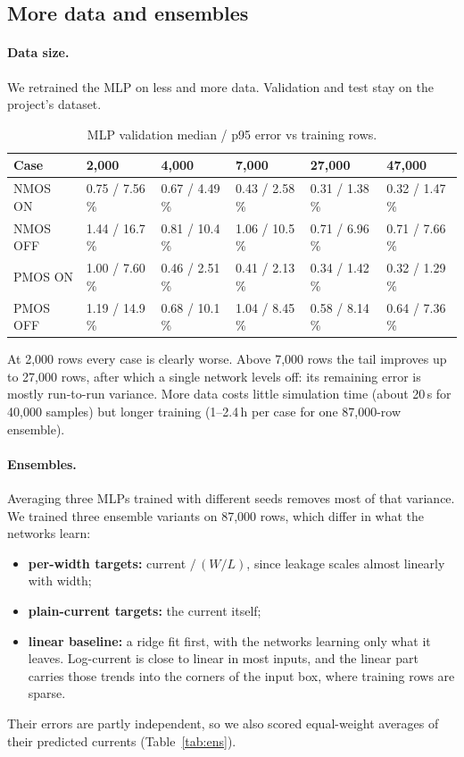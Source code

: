 \documentclass[11pt,a4paper]{article}
\newcommand{\pct}{\,\%}
\begin{document}
\subsection{More data and ensembles}

\paragraph{Data size.} We retrained the MLP on less and more data. Validation and test stay on the
project's dataset.

\begin{table}[H]
\centering
\caption{MLP validation median / p95 error vs training rows.}
\label{tab:size}
\small\setlength{\tabcolsep}{4pt}
\begin{tabular}{llllll}
\toprule
Case & 2,000 & 4,000 & 7,000 & 27,000 & 47,000 \\
\midrule
NMOS ON  & 0.75 / 7.56\pct & 0.67 / 4.49\pct & 0.43 / 2.58\pct & 0.31 / 1.38\pct & 0.32 / 1.47\pct \\
NMOS OFF & 1.44 / 16.7\pct & 0.81 / 10.4\pct & 1.06 / 10.5\pct & 0.71 / 6.96\pct & 0.71 / 7.66\pct \\
PMOS ON  & 1.00 / 7.60\pct & 0.46 / 2.51\pct & 0.41 / 2.13\pct & 0.34 / 1.42\pct & 0.32 / 1.29\pct \\
PMOS OFF & 1.19 / 14.9\pct & 0.68 / 10.1\pct & 1.04 / 8.45\pct & 0.58 / 8.14\pct & 0.64 / 7.36\pct \\
\bottomrule
\end{tabular}
\end{table}

At 2,000 rows every case is clearly worse. Above 7,000 rows the tail improves up to 27,000 rows,
after which a single network levels off: its remaining error is mostly run-to-run variance. More
data costs little simulation time (about 20\,s for 40,000 samples) but longer training (1--2.4\,h per
case for one 87,000-row ensemble).

\paragraph{Ensembles.} Averaging three MLPs trained with different seeds removes most of that
variance. We trained three ensemble variants on 87,000 rows, which differ in what the networks learn:
\begin{itemize}
    \item \textbf{per-width targets:} current $/\,(W/L)$, since leakage scales almost linearly with width;
    \item \textbf{plain-current targets:} the current itself;
    \item \textbf{linear baseline:} a ridge fit first, with the networks learning only what it leaves.
    Log-current is close to linear in most inputs, and the linear part carries those trends into the
    corners of the input box, where training rows are sparse.
\end{itemize}
Their errors are partly independent, so we also scored equal-weight averages of their predicted
currents (Table~\ref{tab:ens}).
\end{document}

